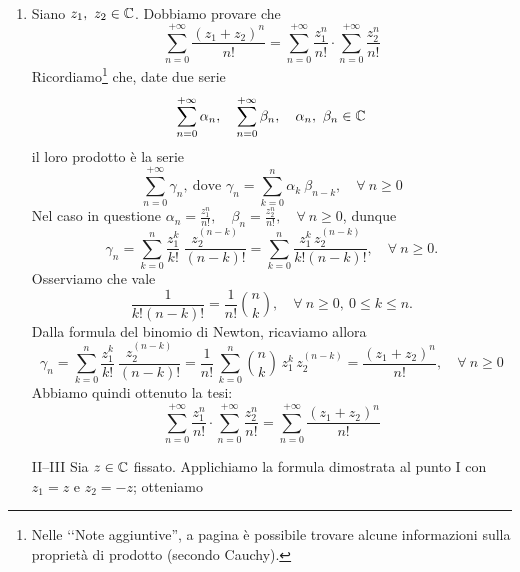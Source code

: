 \begin{demonstration}~{}
\begin{enumerate}[label=\Roman*]
\item Siano $z_1,\ z_2\in\mathbb{C}$. Dobbiamo provare che
\begin{equation*}
	\sum_{n=0}^{+\infty} \frac{(z_1+z_2)^n}{n!} =\sum_{n=0}^{+\infty} \frac{z_1^n}{n!} \cdot \sum_{n=0}^{+\infty} \frac{z_2^n}{n!}
\end{equation*}
Ricordiamo\footnote{Nelle ‘‘Note aggiuntive'', a pagina \pageref{prodottosecondocauchy} è possibile trovare alcune informazioni sulla proprietà di prodotto (secondo Cauchy).} che, date due serie
\begin{equation*}
	\sum_{n=0}^{+\infty} \alpha_n,\quad \sum_{n=0}^{+\infty} \beta_n,\quad \alpha_n, \ \beta_n \in \mathbb{C}
\end{equation*}
il loro prodotto è la serie
\begin{equation*}
	\sum_{n=0}^{+\infty} \gamma_n,\ \text{dove }\gamma_n= \sum_{k=0}^{n} \alpha_k\ \beta_{n-k},\quad \forall \ n\geq 0
\end{equation*}
Nel caso in questione $\alpha_n=\frac{z_1^n}{n!},\quad \beta_n = \frac{z_2^n}{n!},\quad \forall \ n\geq 0$, dunque
\begin{equation*}
	\gamma_n= \sum_{k=0}^{n} \frac{z_1^k}{k!}\ \frac{z_2^{(n-k)}}{(n-k)!}=\sum_{k=0}^{n} \frac{z_1^k\, z_2^{(n-k)}}{k!(n-k)!},\quad \forall \ n\geq 0.
\end{equation*}
Osserviamo che vale
\begin{equation*}
	\frac{1}{k!(n-k)!}= \frac{1}{n!}\binom{n}{k},\quad \forall \ n\geq 0,\ 0\leq k\leq n.
\end{equation*}
Dalla formula del binomio di Newton, ricaviamo allora
\begin{equation*}
	\gamma_n= \sum_{k=0}^{n} \frac{z_1^k}{k!}\ \frac{z_2^{(n-k)}}{(n-k)!}=\frac{1}{n!}\, \sum_{k=0}^{n} \binom{n}{k}\, z_1^k\, z_2^{(n-k)} =\frac{(z_1+z_2)^n}{n!},\quad \forall \ n\geq 0
\end{equation*}
Abbiamo quindi ottenuto la tesi:
\begin{equation*}
	\sum_{n=0}^{+\infty} \frac{z_1^n}{n!} \cdot \sum_{n=0}^{+\infty} \frac{z_2^n}{n!}= \sum_{n=0}^{+\infty} \frac{(z_1+z_2)^n}{n!}
\end{equation*}
\item[II--III] Sia $z\in\mathbb{C}$ fissato. Applichiamo la formula dimostrata al punto I con $z_1=z$ e $z_2=-z$; otteniamo
\begin{equation*}

\end{equation*}
\end{enumerate}
\end{demonstration}
